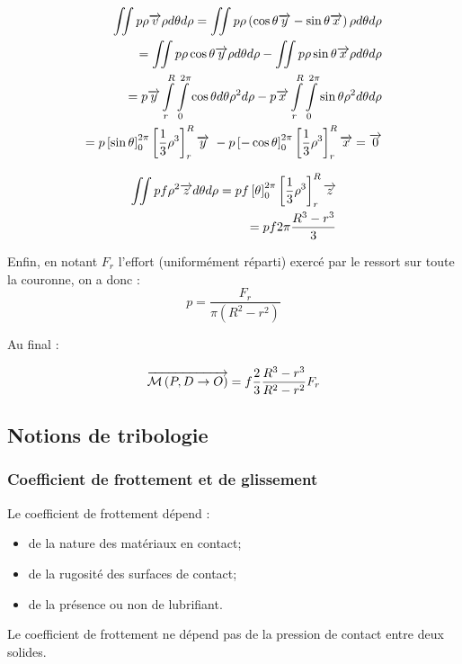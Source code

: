 \documentclass[10pt]{article}
\begin{document}
\begin{exemple}
\begin{eqnarray*}
\iint p\rho\overrightarrow{v} \rho d\theta d\rho = \iint p\rho\left(\cos\theta\overrightarrow{y}-\sin\theta\overrightarrow{x} \right) \rho d\theta d\rho \\
=\iint p\rho\cos\theta\overrightarrow{y}  \rho d\theta d\rho-\iint p\rho \sin\theta\overrightarrow{x}  \rho d\theta d\rho \\
=p \overrightarrow{y}  \int\limits_{r}^{R} \int\limits_{0}^{2\pi}\cos\theta d\theta \rho^2 d\rho- p\overrightarrow{x}\int\limits_{r}^{R} \int\limits_{0}^{2\pi} \sin\theta  \rho^2 d\theta d\rho \\
=p \left[ \sin\theta\right]_{0}^{2\pi}\left[ \dfrac{1}{3}\rho^3\right]_{r}^{R}\overrightarrow{y}\
 -
p \left[ -\cos\theta\right]_{0}^{2\pi}\left[ \dfrac{1}{3}\rho^3\right]_{r}^{R}\overrightarrow{x} = \overrightarrow{0}
\end{eqnarray*}

\begin{eqnarray*}
\iint pf\rho^2 \overrightarrow{z} d\theta d\rho =
pf \left[ \theta\right]_{0}^{2\pi}\left[ \dfrac{1}{3}\rho^3\right]_{r}^{R} \overrightarrow{z}\\
= pf2\pi \dfrac{R^3-r^3}{3} 
\end{eqnarray*} 

Enfin, en notant $F_r$ l'effort (uniformément réparti) exercé par le ressort sur toute la couronne, on a donc :
$$
p=\dfrac{F_r}{\pi \left(R^2-r^2 \right)}
$$

Au final : 

$$ \overrightarrow{\mathcal{M}\left( {P}, {D} \rightarrow {O}\right)}  
= f\dfrac{2}{3} \dfrac{R^3-r^3}{R^2-r^2} F_r
$$
\end{exemple}
\subsection{Notions de tribologie}

\subsubsection{Coefficient de frottement et de glissement}
Le coefficient de frottement dépend : 
\begin{itemize}
\item de la nature des matériaux en contact; 
\item de la rugosité des surfaces de contact; 
\item de la présence ou non de lubrifiant.
\end{itemize}

Le coefficient de frottement ne dépend pas de la pression de contact entre deux solides.
\end{document}
